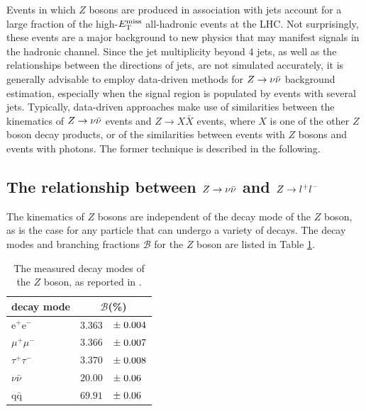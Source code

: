 Events in which $Z$ bosons are produced in association with jets account for a large fraction of the high-$E_{\text{T}}^{\rm miss}$ all-hadronic events at the LHC. Not surprisingly, these events are a major background to new physics that may manifest signals in the hadronic channel. Since the jet multiplicity beyond 4 jets, as well as the relationships between the directions of jets, are not simulated accurately, it is generally advisable to employ data-driven methods for $Z\rightarrow \nu\bar{\nu}$ background estimation, especially when the signal region is populated by events with several jets. Typically, data-driven approaches make use of similarities between the kinematics of $Z\rightarrow \nu\bar{\nu}$ events and $Z\rightarrow X\bar{X}$ events, where $X$ is one of the other $Z$ boson decay products, or of the similarities between events with $Z$ bosons and events with photons. The former technique is described in the following.


\subsection{The relationship between $Z\rightarrow \nu\bar{\nu}$ and $Z\rightarrow l^+l^-$}
The kinematics of $Z$ bosons are independent of the decay mode of the $Z$ boson, as is the case for any particle that can undergo a variety of decays. The decay modes and branching fractions $\mathcal{B}$ for the $Z$ boson are listed in Table \ref{tab:zdecay}. 

\begin{table}[h]
\vspace{0.5cm}
\centering
\begin{tabular}{l|rl}
\hline
decay mode & \multicolumn{2}{c}{$\mathcal{B}$(\%)}\\
\hline
e$^+$e$^-$ & $3.363$&\hspace{-3mm}$\pm \hspace{1mm}0.004$\\
$\mu^+\mu^-$ & $3.366$&\hspace{-3mm}$\pm \hspace{1mm}0.007$\\
$\tau^+\tau^-$ & $3.370$&\hspace{-3mm}$\pm \hspace{1mm}0.008$\\
$\nu\bar{\nu}$ & $20.00$&\hspace{-3mm}$\pm \hspace{1mm}0.06$\\
q$\bar{\text{q}}$ & $69.91$&\hspace{-3mm}$\pm \hspace{1mm}0.06$\\
\hline
\end{tabular}
\caption{The measured decay modes of the $Z$ boson, as reported in \cite{Agashe:2014kda}.}
\label{tab:zdecay}
\end{table}

